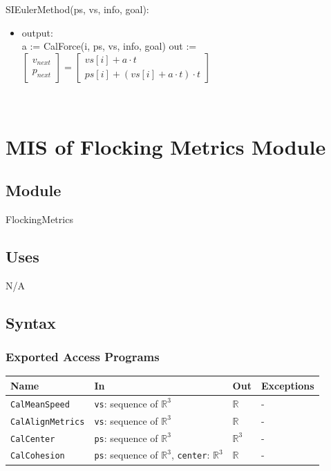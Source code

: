 \documentclass[12pt, titlepage]{article}
\begin{document}
\noindent SIEulerMethod(ps, vs, info, goal):
\begin{itemize}
\item output: \\
a := CalForce(i, ps, vs, info, goal)
out := $\begin{bmatrix} v_{next} \\ p_{next} \end{bmatrix} = \begin{bmatrix} vs[i] + a \cdot t \\ ps[i] + (vs[i] + a \cdot t) \cdot t \end{bmatrix}$
\end{itemize}

~\newpage

\section{MIS of Flocking Metrics Module} \label{mFM}

\subsection{Module}

FlockingMetrics

\subsection{Uses}

N/A

\subsection{Syntax}

\subsubsection{Exported Access Programs}

\begin{center}
\begin{tabular}{p{4cm} p{4cm} p{4cm} p{2cm}}
\hline
\textbf{Name} & \textbf{In} & \textbf{Out} & \textbf{Exceptions} \\
\hline
\texttt{CalMeanSpeed} & \texttt{vs}: sequence of $\mathbb{R}^3$ & $\mathbb{R}$ & - \\
\texttt{CalAlignMetrics} & \texttt{vs}: sequence of $\mathbb{R}^3$ & $\mathbb{R}$ & - \\
\texttt{CalCenter} & \texttt{ps}: sequence of $\mathbb{R}^3$ & $\mathbb{R}^3$ & - \\
\texttt{CalCohesion} & \texttt{ps}: sequence of $\mathbb{R}^3$, \texttt{center}: $\mathbb{R}^3$ & $\mathbb{R}$ & - \\
\hline
\end{tabular}
\end{center}
\end{document}
